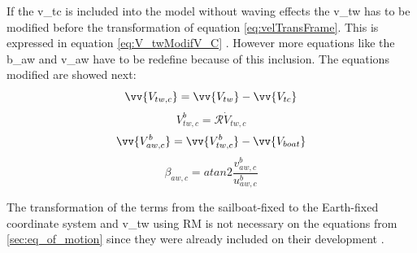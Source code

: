 If the \acrshort{v_tc} is included into the model without waving effects the \acrshort{v_tw} has to be modified before the transformation of equation \ref{eq:velTransFrame}. This is expressed in equation \ref{eq:V_twModifV_C} \cite{allsopp1998stochastic}. However more equations like the \acrshort{b_aw} and \acrshort{v_aw} have to be redefine because of this inclusion. The equations modified are showed next:
\begin{equation}\label{eq:V_twModifV_C}
    \vv{V_{tw,c}}=\vv{V_{tw}}- \vv{V_{tc}}
\end{equation}
\begin{equation}\label{eq:v_twCurBoat}
    V_{tw,c}^b=\mathcal{R} \dot V_{tw,c}
\end{equation}
\begin{equation} \label{eq:VelCurrWind_boat}
    \vv{V_{aw,c}^b}= \vv{V_{tw,c}^b} - \vv{V_{boat}}
\end{equation}
\begin{equation}\label{eq:b_tw_c}
    \beta_{aw,c}= atan2 \frac {v_{aw,c}^b}{u_{aw,c}^b}
\end{equation}

The transformation of the terms from the sailboat-fixed to the Earth-fixed coordinate system and \acrshort{v_tw} using \acrshort{RM} is not necessary on the equations from \ref{sec:eq_of_motion} since they were already included on their development \cite{keuning2004mathematical}.\par  





